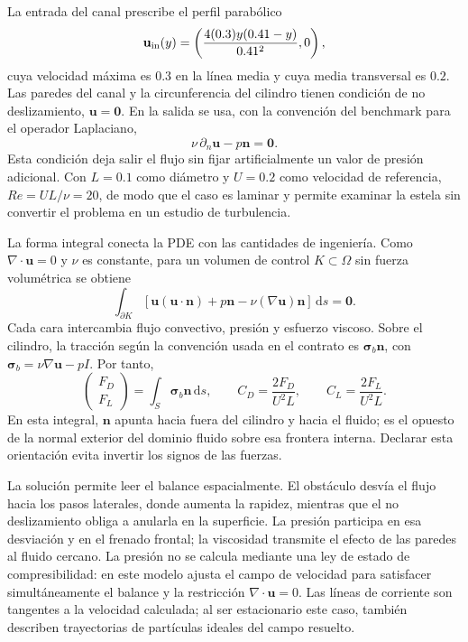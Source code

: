 La entrada del canal prescribe el perfil parabólico
\begin{equation}
\mathbf u_{\rm in}(y)=
\left(\frac{4(0.3)y(0.41-y)}{0.41^2},0\right),
\label{eq:expansion-p4-inlet}
\end{equation}
cuya velocidad máxima es $0.3$ en la línea media y cuya media transversal
es $0.2$. Las paredes del canal y la circunferencia del cilindro tienen
condición de no deslizamiento, $\mathbf u=\mathbf0$. En la salida se usa,
con la convención del benchmark para el operador Laplaciano,
\begin{equation}
\nu\,\partial_n\mathbf u-p\mathbf n=\mathbf0.
\label{eq:expansion-p4-outlet}
\end{equation}
Esta condición deja salir el flujo sin fijar artificialmente un valor de
presión adicional. Con $L=0.1$ como diámetro y $U=0.2$ como velocidad de
referencia, $Re=UL/\nu=20$, de modo que el caso es laminar y permite
examinar la estela sin convertir el problema en un estudio de turbulencia.

La forma integral conecta la PDE con las cantidades de ingeniería. Como
$\nabla\cdot\mathbf u=0$ y $\nu$ es constante, para un volumen de control
$K\subset\Omega$ sin fuerza volumétrica se obtiene
\begin{equation}
\int_{\partial K}
\left[\mathbf u(\mathbf u\cdot\mathbf n)+p\mathbf n
      -\nu(\nabla\mathbf u)\mathbf n\right]\,\mathrm d s=\mathbf0.
\label{eq:expansion-p4-integral}
\end{equation}
Cada cara intercambia flujo convectivo, presión y esfuerzo viscoso. Sobre el
cilindro, la tracción según la convención usada en el contrato es
$\boldsymbol\sigma_b\mathbf n$, con
$\boldsymbol\sigma_b=\nu\nabla\mathbf u-pI$. Por tanto,
\begin{equation}
\begin{pmatrix}F_D\\F_L\end{pmatrix}
 =\int_S\boldsymbol\sigma_b\mathbf n\,\mathrm d s,
\qquad
C_D=\frac{2F_D}{U^2L},
\qquad
C_L=\frac{2F_L}{U^2L}.
\label{eq:expansion-p4-forces}
\end{equation}
En esta integral, $\mathbf n$ apunta hacia fuera del cilindro y hacia el
fluido; es el opuesto de la normal exterior del dominio fluido sobre esa
frontera interna. Declarar esta orientación evita invertir los signos de
las fuerzas.

La solución permite leer el balance espacialmente. El obstáculo desvía el
flujo hacia los pasos laterales, donde aumenta la rapidez, mientras que el
no deslizamiento obliga a anularla en la superficie. La presión participa
en esa desviación y en el frenado frontal; la viscosidad transmite el efecto
de las paredes al fluido cercano. La presión no se calcula mediante una
ley de estado de compresibilidad: en este modelo ajusta el campo de
velocidad para satisfacer simultáneamente el balance y la restricción
$\nabla\!\cdot\mathbf u=0$. Las líneas de corriente son tangentes a la
velocidad calculada; al ser estacionario este caso, también describen
trayectorias de partículas ideales del campo resuelto.

